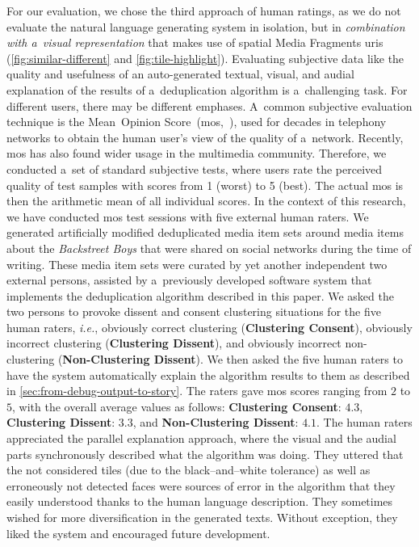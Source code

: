 \documentclass{article}
\begin{document}
For our evaluation, we chose the third approach of human ratings, as we do not evaluate the natural language generating system in isolation, but in \emph{combination with a~visual representation} that makes use of spatial Media Fragments {\sc uri}s (\autoref{fig:similar-different} and \autoref{fig:tile-highlight}). Evaluating subjective data like the quality and usefulness of an auto-generated textual, visual, and audial explanation of the results of a~deduplication algorithm is a~challenging task. For different users, there may be different emphases. A~common subjective evaluation technique
is the Mean~Opinion Score~({\sc mos},~\cite{itu1998mos}), used for decades in telephony networks to obtain the human user's view of the quality of a~network.
Recently, {\sc mos} has also found wider usage in the multimedia community. Therefore, we conducted a~set of standard subjective tests, where users rate the perceived quality of test samples with scores from 1 (worst) to 5 (best). The actual {\sc mos} is then the arithmetic mean of all individual scores. In the context of this research, we have conducted {\sc mos} test sessions with five external human raters. We generated artificially modified deduplicated media item sets around media items about the \emph{Backstreet Boys} that were shared on social networks during the time of writing. These media item sets were curated by yet another independent two external persons, assisted by a~previously developed software system that implements the deduplication algorithm described in this paper. We asked the two persons to provoke dissent and consent clustering situations for the five human raters, \emph{i.e.}, obviously correct clustering (\textbf{Clustering Consent}), obviously incorrect clustering (\textbf{Clustering Dissent}), and obviously incorrect non-clustering (\textbf{Non-Clustering Dissent}). We then asked the five human raters to have the system automatically explain the algorithm results to them as described in \autoref{sec:from-debug-output-to-story}. The raters gave {\sc mos} scores ranging from $2$ to $5$, with the overall average values as follows: \textbf{Clustering Consent}: $4.3$, \textbf{Clustering Dissent}: $3.3$, and \textbf{Non-Clustering Dissent}: $4.1$. The human raters appreciated the parallel explanation approach, where the visual and the audial parts synchronously described what the algorithm was doing. They uttered that the not considered tiles (due to the black--and--white tolerance) as well as erroneously not detected faces were sources of error in the algorithm that they easily understood thanks to the human language description. They sometimes wished for more diversification in the generated texts. Without exception, they liked the system and encouraged future development.
\end{document}
